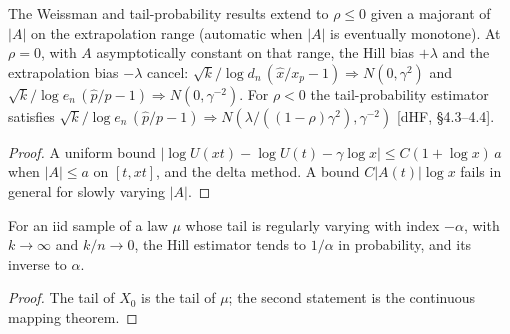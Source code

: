 \begin{theorem}[Extreme quantiles at $\rho = 0$: bias cancellation]
  \label{thm:weissman-rho-zero}
  \leanok
  The Weissman and tail-probability results extend to $\rho \le 0$ given a majorant of $|A|$ on the
  extrapolation range (automatic when $|A|$ is eventually monotone). At $\rho = 0$, with $A$ asymptotically
  constant on that range, the Hill bias $+\lambda$ and the extrapolation bias $-\lambda$ cancel:
  $\sqrt k/\log d_n\,(\hat x/x_p - 1) \Rightarrow N(0, \gamma^2)$ and
  $\sqrt k/\log e_n\,(\hat p/p - 1) \Rightarrow N(0, \gamma^{-2})$. For $\rho < 0$ the tail-probability
  estimator satisfies $\sqrt k/\log e_n\,(\hat p/p - 1) \Rightarrow N(\lambda/((1-\rho)\gamma^2), \gamma^{-2})$
  [dHF, \S4.3--4.4].
\end{theorem}
\begin{proof}
  \leanok
  A uniform bound $|\log U(xt) - \log U(t) - \gamma \log x| \le C(1 + \log x)\,a$ when $|A| \le a$ on $[t, xt]$, and
  the delta method. A bound $C|A(t)|\log x$ fails in general for slowly varying $|A|$.
\end{proof}

\begin{corollary}
  \label{cor:hill-of-law}
  \leanok
  For an iid sample of a law $\mu$ whose tail is regularly varying with index $-\alpha$, with $k \to \infty$
  and $k / n \to 0$, the Hill estimator tends to $1 / \alpha$ in probability, and its inverse to $\alpha$.
\end{corollary}
\begin{proof}
  \leanok
  The tail of $X_0$ is the tail of $\mu$; the second statement is the continuous mapping theorem.
\end{proof}
